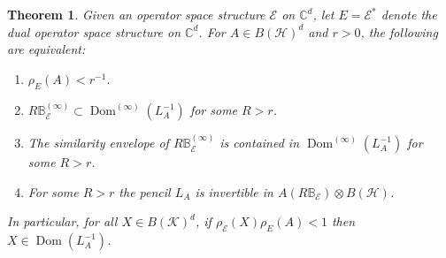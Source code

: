 \documentclass[12pt]{amsart}
\numberwithin{equation}{section}
\newtheorem{theorem}{Theorem}[section]
\theoremstyle{definition}
\newcommand{\cE}{\mathcal{E}}
\newcommand{\cH}{\mathcal{H}}
\newcommand{\cK}{\mathcal{K}}
\newcommand{\bB}{\mathbb{B}}
\newcommand{\bC}{\mathbb{C}}
\newcommand{\dom}{\operatorname{Dom}}
\begin{document}
\begin{theorem}\label{thm:rVSdom}
    Given an operator space structure $\cE$ on $\bC^d$, let $E = \cE^*$ denote the dual operator space structure on $\bC^d$. 
    For $A \in B(\cH)^d$ and $r > 0$, the following are equivalent:
    \begin{enumerate}
        \item $\rho_E(A) < r^{-1}$. \label{it:rho_lt_r}
        \item $R\bB_\cE^{(\infty)}\subset \dom^{(\infty)}(L^{-1}_A)$ for some $R > r$. \label{it:RBEinf}
        \item The similarity envelope of $R\bB^{(\infty)}_\cE$ is contained in $\dom^{(\infty)}(L^{-1}_A)$ for some $R > r$.\label{it:RBEinf_sim}
        \item For some $R > r$ the pencil $L_A$ is invertible in $A(R\bB_\cE) \otimes B(\cH)$. \label{it:inABE}
    \end{enumerate}
    In particular, for all $X \in B(\cK)^d$, if $\rho_\cE(X) \rho_E(A) < 1$ then $X \in \dom(L_A^{-1})$.
\end{theorem}
\end{document}

